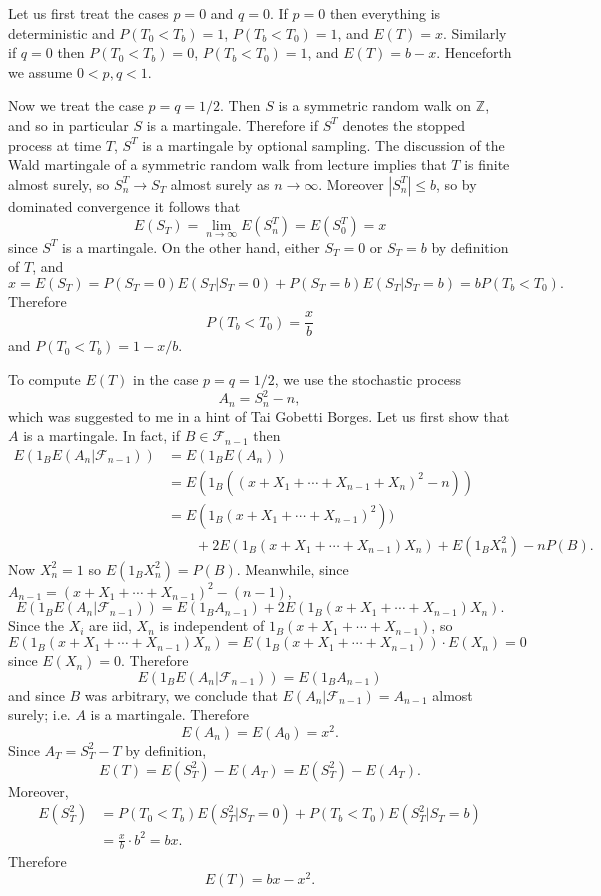\documentclass[10pt]{article}
\newcommand{\ZZ}{\mathbb{Z}}
\theoremstyle{definition}
\begin{document}
Let us first treat the cases $p = 0$ and $q = 0$.
If $p = 0$ then everything is deterministic and $P(T_0 < T_b) = 1$, $P(T_b < T_0) = 1$, and $E(T) = x$.
Similarly if $q = 0$ then $P(T_0 < T_b) = 0$, $P(T_b < T_0) = 1$, and $E(T) = b - x$.
Henceforth we assume $0 < p, q < 1$.

Now we treat the case $p = q = 1/2$.
Then $S$ is a symmetric random walk on $\ZZ$, and so in particular $S$ is a martingale.
Therefore if $S^T$ denotes the stopped process at time $T$, $S^T$ is a martingale by optional sampling.
The discussion of the Wald martingale of a symmetric random walk from lecture implies that $T$ is finite almost surely, so $S^T_n \to S_T$ almost surely as $n \to \infty$.
Moreover $|S^T_n| \leq b$, so by dominated convergence it follows that
$$E(S_T) = \lim_{n \to \infty} E(S^T_n) = E(S^T_0) = x$$
since $S^T$ is a martingale.
On the other hand, either $S_T = 0$ or $S_T = b$ by definition of $T$, and
$$x = E(S_T) = P(S_T = 0)E(S_T|S_T = 0) + P(S_T = b)E(S_T|S_T = b) = bP(T_b < T_0).$$
Therefore
$$P(T_b < T_0) = \frac{x}{b}$$
and $P(T_0 < T_b) = 1 - x/b$.

To compute $E(T)$ in the case $p = q = 1/2$, we use the stochastic process
$$A_n = S_n^2 - n,$$
which was suggested to me in a hint of Tai Gobetti Borges.
Let us first show that $A$ is a martingale.
In fact, if $B \in \mathcal F_{n-1}$ then
\begin{align*}
E(1_B E(A_n|\mathcal F_{n-1})) &= E(1_B E(A_n))\\
&= E(1_B((x + X_1 + \cdots + X_{n-1} + X_n)^2 - n))\\
&= E(1_B(x + X_1 + \cdots + X_{n-1})^2))\\
&\qquad + 2E(1_B(x + X_1 + \cdots + X_{n-1})X_n) + E(1_B X_n^2) - nP(B).
\end{align*}
Now $X_n^2 = 1$ so $E(1_B X_n^2) = P(B)$. Meanwhile, since $A_{n - 1} = (x + X_1 + \cdots + X_{n-1})^2 - (n - 1)$,
$$E(1_B E(A_n|\mathcal F_{n-1})) = E(1_B A_{n-1}) + 2E(1_B(x + X_1 + \cdots + X_{n-1})X_n).$$
Since the $X_i$ are iid, $X_n$ is independent of $1_B(x + X_1 + \cdots + X_{n-1})$, so
$$E(1_B(x + X_1 + \cdots + X_{n-1})X_n) = E(1_B(x + X_1 + \cdots + X_{n-1})) \cdot E(X_n) = 0$$
since $E(X_n) = 0$.
Therefore
$$E(1_B E(A_n|\mathcal F_{n-1})) = E(1_B A_{n-1})$$
and since $B$ was arbitrary, we conclude that $E(A_n|\mathcal F_{n-1}) = A_{n-1}$ almost surely; i.e. $A$ is a martingale.
Therefore
$$E(A_n) = E(A_0) = x^2.$$
Since $A_T = S_T^2 - T$ by definition,
$$E(T) = E(S_T^2) - E(A_T) = E(S_T^2) - E(A_T).$$
Moreover,
\begin{align*}E(S_T^2) &= P(T_0 < T_b) E(S_T^2|S_T = 0) + P(T_b < T_0) E(S_T^2|S_T = b) \\
&= \frac{x}{b} \cdot b^2 = bx.
\end{align*}
Therefore
$$E(T) = bx - x^2.$$
\end{document}
